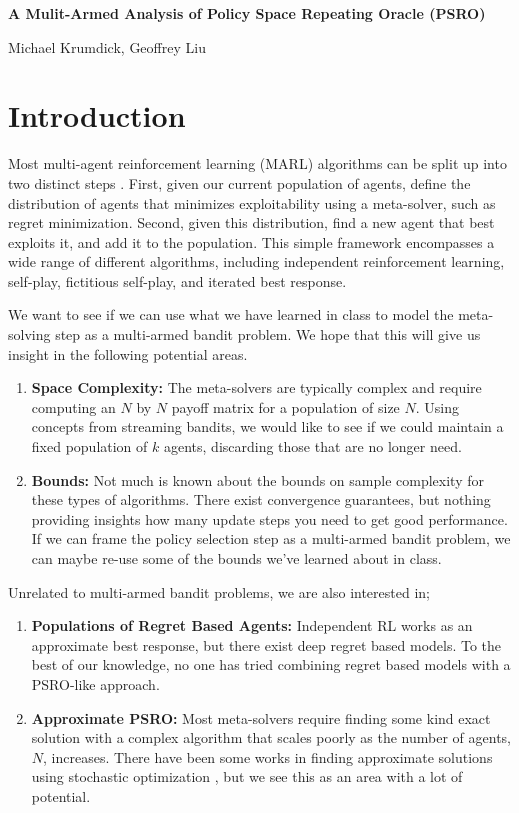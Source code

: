 \documentclass{article}
\begin{document}
\noindent \large\textbf{A Mulit-Armed Analysis of Policy Space Repeating Oracle
(PSRO)}

\noindent \large Michael Krumdick, Geoffrey Liu

\section{Introduction}
Most multi-agent reinforcement learning (MARL) algorithms can be split up into two
distinct steps \cite{PSRO}. First, given our current population of agents,
define the distribution of agents that minimizes exploitability using a
meta-solver, such as regret minimization. Second, given this distribution, find
a new agent that best exploits it, and add it to the population. This simple
framework encompasses a wide range of different algorithms, including
independent reinforcement learning, self-play, fictitious self-play, and
iterated best response. 

We want to see if we can use what we have learned in class to model the
meta-solving step as a multi-armed bandit problem. We hope that this will give
us insight in the following potential areas.

\begin{enumerate}
	\item \textbf{Space Complexity:} The meta-solvers are typically complex and
        require computing an $N$ by $N$ payoff matrix for a population of size
        $N$. Using concepts from streaming bandits, we would like to see if we
        could maintain a fixed population of $k$ agents, discarding those that
        are no longer need.
	\item \textbf{Bounds:} Not much is known about the bounds on sample
        complexity for these types of algorithms. There exist convergence
        guarantees, but nothing providing insights how many update steps you
        need to get good performance. If we can frame the policy selection step
        as a multi-armed bandit problem, we can maybe re-use some of the bounds
        we've learned about in class.
\end{enumerate}

Unrelated to multi-armed bandit problems, we are also interested in;
\begin{enumerate}
	\item \textbf{Populations of Regret Based Agents:} Independent RL works as an approximate best
        response, but there exist deep regret based models. To the best of our
        knowledge, no one has tried combining regret based models with a
        PSRO-like approach.
    \item \textbf{Approximate PSRO:} Most meta-solvers require finding some kind
        exact solution with a complex algorithm that scales poorly as the number
        of agents, $N$, increases. There have been some works in finding
        approximate solutions using stochastic optimization \cite{alphalpha},
        but we see this as an area with a lot of potential.
\end{enumerate}
\end{document}

